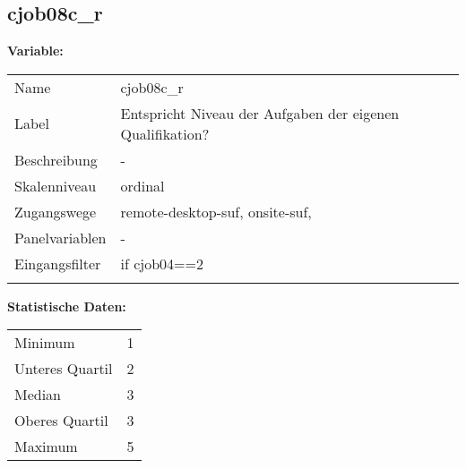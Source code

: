 	
	
	\subsection{cjob08c\_r}
	\label{subSection:cjob08c_r}

	\noindent\textbf{Variable:}\\
		\begin{tabular}{lL{11.3cm}}
			\label{tableVariable:cjob08c_r}
			Name & cjob08c\_r \\
			Label & Entspricht Niveau der Aufgaben der eigenen Qualifikation? \\
			Beschreibung & - \\
			Skalenniveau & ordinal \\
			Zugangswege &
				remote-desktop-suf,
				onsite-suf,
 \\
			Panelvariablen & -
			 \\
			Eingangsfilter & if cjob04==2 \\
 \\
		\end{tabular}



		\vspace*{1 cm}
		\noindent\textbf{Statistische Daten:}\\
			\begin{tabular}{ll}
				\label{tableStatistics:cjob08c_r}
					Minimum & 1 \\
					Unteres Quartil & 2 \\
					Median & 3 \\
					Oberes Quartil & 3 \\
					Maximum & 5 \\
			\end{tabular}



